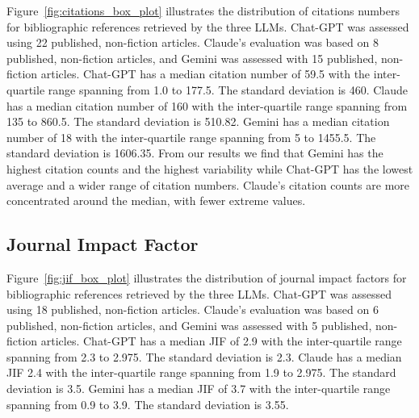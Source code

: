 \documentclass[runningheads]{llncs}
\begin{document}
Figure~\ref{fig:citations_box_plot} illustrates the distribution of citations numbers for bibliographic references retrieved by the three LLMs.
Chat-GPT was assessed using 22 published, non-fiction articles. Claude's evaluation was based on 8 published, non-fiction articles, and Gemini was assessed with 15 published, non-fiction articles.
Chat-GPT has a median citation number of 59.5 with the inter-quartile range spanning from 1.0 to 177.5. The standard deviation is 460.
Claude has a median citation number of 160 with the inter-quartile range spanning from 135 to 860.5. The standard deviation is 510.82.
Gemini has a median citation number of 18 with the inter-quartile range spanning from 5 to 1455.5. The standard deviation is 1606.35.
From our results we find that Gemini has the highest citation counts and the highest variability while Chat-GPT has the lowest average and a wider range of citation numbers.
Claude's citation counts are more concentrated around the median, with fewer extreme values.

\subsection{Journal Impact Factor}

Figure~\ref{fig:jif_box_plot} illustrates the distribution of journal impact factors for bibliographic references retrieved by the three LLMs.
Chat-GPT was assessed using 18 published, non-fiction articles. Claude's evaluation was based on 6 published, non-fiction articles, and Gemini was assessed with 5 published, non-fiction articles.
Chat-GPT has a median JIF of 2.9 with the inter-quartile range spanning from 2.3 to 2.975. The standard deviation is 2.3.
Claude has a median JIF 2.4 with the inter-quartile range spanning from 1.9 to 2.975. The standard deviation is 3.5.
Gemini has a median JIF of 3.7 with the inter-quartile range spanning from 0.9 to 3.9. The standard deviation is 3.55.
\end{document}
